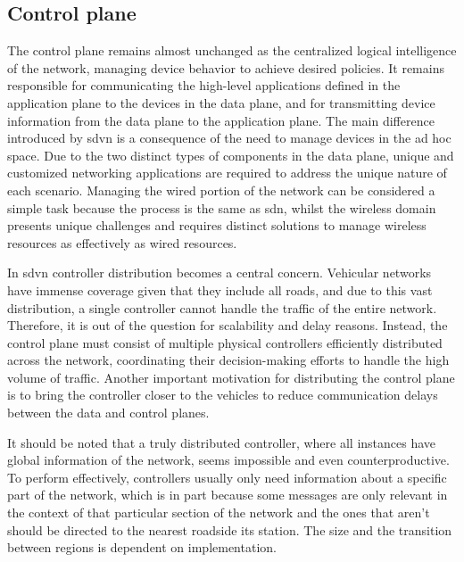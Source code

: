 \subsection{Control plane}

The control plane remains almost unchanged as the centralized logical intelligence of the network, managing device behavior to achieve desired policies. It remains responsible for communicating the high-level applications defined in the application plane to the devices in the data plane, and for transmitting device information from the data plane to the application plane. The main difference introduced by \gls{sdvn} is a consequence of the need to manage devices in the ad hoc space. Due to the two distinct types of components in the data plane, unique and customized networking applications are required to address the unique nature of each scenario. Managing the wired portion of the network can be considered a simple task because the process is the same as \gls{sdn}, whilst the wireless domain presents unique challenges and requires distinct solutions to manage wireless resources as effectively as wired resources\cite{cardona_software-defined_2020}.

In \gls{sdvn} controller distribution becomes a central concern. Vehicular networks have immense coverage given that they include all roads, and due to this vast distribution, a single controller cannot handle the traffic of the entire network. Therefore, it is out of the question for scalability and delay reasons\cite{toufga_openflow_2018}. Instead, the control plane must consist of multiple physical controllers efficiently distributed across the network, coordinating their decision-making efforts to handle the high volume of traffic\cite{ben_jaballah_security_2020}. Another important motivation for distributing the control plane is to bring the controller closer to the vehicles to reduce communication delays between the data and control planes\cite{nkenyereye_software-defined_2019}. 

It should be noted that a truly distributed controller, where all instances have global information of the network, seems impossible and even counterproductive. To perform effectively, controllers usually only need information about a specific part of the network, which is in part because some messages are only relevant in the context of that particular section of the network\cite{cardona_software-defined_2020} and the ones that aren't should be directed to the nearest roadside \gls{its} station. The size and the transition between regions is dependent on implementation. 

